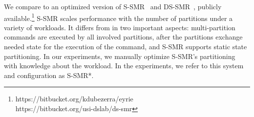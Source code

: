 We compare \dynastar{} to an optimized version of S-SMR~\cite{bezerra2014ssmr}
and DS-SMR~\cite{hoang2016}, publicly
available.\footnote{https://bitbucket.org/kdubezerra/eyrie\\
https://bitbucket.org/usi-dslab/ds-smr} S-SMR scales performance with the number
of partitions under a variety of workloads. It differs from \dynastar{} in two
important aspects: multi-partition commands are executed by all involved
partitions, after the partitions exchange needed state for the execution of the
command, and S-SMR supports static state partitioning. In our experiments, we
manually optimize S-SMR's partitioning with knowledge about the workload. In the
experiments, we refer to this system and configuration as S-SMR*.

